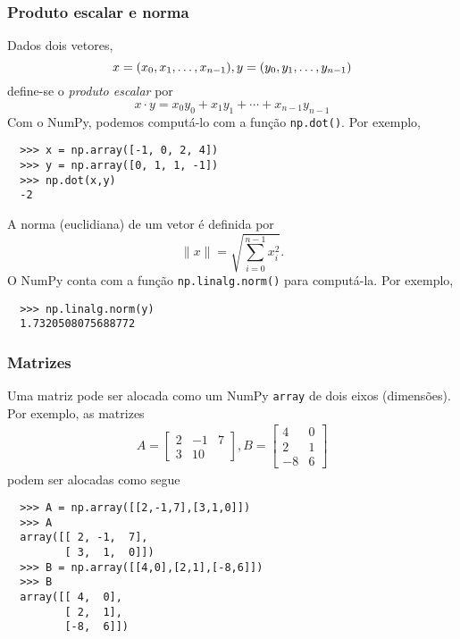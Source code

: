\documentclass[12pt]{article}
\begin{document}
\subsubsection{Produto escalar e norma}

Dados dois vetores,
\begin{equation}
  x = (x_0, x_1, \dotsc, x_{n-1}),\\
  y = (y_0, y_1, \dotsc, y_{n-1})
\end{equation}
define-se o \emph{produto escalar} por
\begin{equation}
  x\cdot y = x_0y_0 + x_1y_1 + \cdots + x_{n-1}y_{n-1}
\end{equation}
Com o NumPy, podemos computá-lo com a função \lstinline+np.dot()+. Por exemplo,
\begin{lstlisting}
  >>> x = np.array([-1, 0, 2, 4])
  >>> y = np.array([0, 1, 1, -1])
  >>> np.dot(x,y)
  -2
\end{lstlisting}

A norma (euclidiana) de um vetor é definida por
\begin{equation}
  \|x\| = \sqrt{\sum_{i=0}^{n-1} x_i^2}.
\end{equation}
O NumPy conta com a função \lstinline+np.linalg.norm()+ para computá-la. Por exemplo,
\begin{lstlisting}
  >>> np.linalg.norm(y)
  1.7320508075688772
\end{lstlisting}

\subsubsection{Matrizes}

Uma matriz pode ser alocada como um NumPy \lstinline+array+ de dois eixos (dimensões). Por exemplo, as matrizes
\begin{gather}
  A =
  \begin{bmatrix}
    2 & -1 & 7\\
    3 & 1 0
  \end{bmatrix},
  B =
  \begin{bmatrix}
    4 & 0\\
    2 & 1\\
   -8 & 6
  \end{bmatrix}
\end{gather}
podem ser alocadas como segue
\begin{lstlisting}
  >>> A = np.array([[2,-1,7],[3,1,0]])
  >>> A
  array([[ 2, -1,  7],
         [ 3,  1,  0]])
  >>> B = np.array([[4,0],[2,1],[-8,6]])
  >>> B
  array([[ 4,  0],
         [ 2,  1],
         [-8,  6]])
\end{lstlisting}
\end{document}
